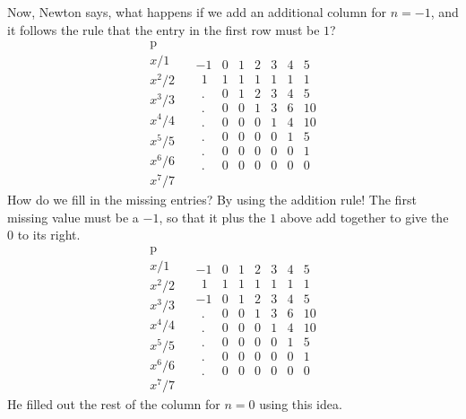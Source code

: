 \documentclass[11pt, oneside]{article}
\begin{document}
Now, Newton says, what happens if we add an additional column for $n=-1$, and it follows the rule that the entry in the first row must be $1$?
\[
\begin{matrix}
\text{p}  \\
x/1  \\
x^2/2 \\
x^3/3 \\
x^4/4 \\
x^5/5 \\
x^6/6 \\
x^7/7
\end{matrix} \ \ \ \
\begin{matrix}
-1 & 0 & 1 & 2 & 3 & 4 & 5  \\
\ \ 1 & 1 & 1 & 1 & 1 & 1 & 1  \\
\ \ . & 0 & 1 & 2 & 3 & 4 & 5 \\
\ \ . & 0 & 0 & 1 & 3 & 6 & 10 \\
\ \ . & 0 & 0 & 0 & 1 & 4 & 10 \\
\ \ . & 0 & 0 & 0 & 0 & 1 & 5 \\
\ \ . & 0 & 0 & 0 & 0 & 0 & 1 \\
\ \ . & 0 & 0 & 0 & 0 & 0 & 0
\end{matrix}
\]
How do we fill  in the missing entries?  By using the addition rule!  The first missing value must be a $-1$, so that it plus the $1$ above add together to give the $0$ to its right.
\[
\begin{matrix}
\text{p}  \\
x/1  \\
x^2/2 \\
x^3/3 \\
x^4/4 \\
x^5/5 \\
x^6/6 \\
x^7/7
\end{matrix} \ \ \ \
\begin{matrix}
-1 & 0 & 1 & 2 & 3 & 4 & 5  \\
\ \ 1 & 1 & 1 & 1 & 1 & 1 & 1  \\
-1 & 0 & 1 & 2 & 3 & 4 & 5 \\
\ \ . & 0 & 0 & 1 & 3 & 6 & 10 \\
\ \ . & 0 & 0 & 0 & 1 & 4 & 10 \\
\ \ . & 0 & 0 & 0 & 0 & 1 & 5 \\
\ \ . & 0 & 0 & 0 & 0 & 0 & 1 \\
\ \ . & 0 & 0 & 0 & 0 & 0 & 0
\end{matrix}
\]
He filled out the rest of the column for $n=0$ using this idea.  
\end{document}
